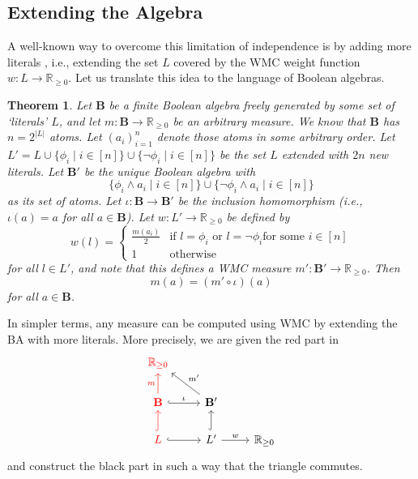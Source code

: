\documentclass{article}
\newtheorem{theorem}{Theorem}
\theoremstyle{definition}
\theoremstyle{remark}
\begin{document}
\subsection{Extending the Algebra}


A well-known way to overcome this limitation of independence is by adding more
literals \cite{DBLP:journals/ai/ChaviraD08}, i.e., extending the set $L$ covered
by the WMC weight function $w\colon L \to \mathbb{R}_{\ge 0}$. Let us translate this
idea to the language of Boolean algebras.

\begin{theorem} \label{thm:extension} %
  Let $\mathbf{B}$ be a finite Boolean algebra freely generated by some set of
  `literals' $L$, and let $m\colon \mathbf{B} \to \mathbb{R}_{\ge 0}$ be an
  arbitrary measure. We know that $\mathbf{B}$ has $n = 2^{|L|}$ atoms. Let
  $(a_i)_{i=1}^n$ denote those atoms in some arbitrary order. Let $L' = L \cup
  \{ \phi_i \mid i \in [n] \} \cup \{ \neg \phi_i \mid i \in [n] \}$ be the set
  $L$ extended with $2n$ new literals. Let $\mathbf{B'}$ be the unique Boolean
  algebra with
  \[
    \{ \phi_i \land a_i \mid i \in [n] \} \cup \{ \neg \phi_i \land a_i \mid i
    \in [n] \}
  \]
  as its set of atoms. Let $\iota\colon \mathbf{B} \to \mathbf{B'}$ be the inclusion
  homomorphism (i.e., $\iota(a) = a$ for all $a \in \mathbf{B}$). Let $w\colon L'
  \to \mathbb{R}_{\ge 0}$ be defined by
  \[
    w(l) = \begin{cases}
      \frac{m(a_i)}{2} & \text{if } l = \phi_i \text{ or } l = \neg\phi_i \text{
        for some } i \in [n] \\
      1 & \text{otherwise}
    \end{cases}
  \]
  for all $l \in L'$, and note that this defines a WMC measure $m'\colon \mathbf{B'}
  \to \mathbb{R}_{\ge 0}$. Then
  \[
    m(a) = (m' \circ \iota)(a)
  \]
  for all $a \in \mathbf{B}$.
\end{theorem}

In simpler terms, any measure can be computed using WMC by extending the BA with
more literals. More precisely, we are given the red part in
\[
  \begin{tikzcd}
    \textcolor{red}{\mathbb{R}_{\ge 0}} & & \\
    \textcolor{red}{\mathbf{B}} \arrow[red]{u}{m} \ar[r,hookrightarrow,"\iota"]
    & \mathbf{B'} \arrow{lu}[swap]{m'} & \\
    \textcolor{red}{L} \ar[u,red,hookrightarrow] \ar[r,hookrightarrow] & L'
    \ar[u,hookrightarrow] \arrow{r}{w} & \mathbb{R}_{\ge 0}
  \end{tikzcd}
\]
and construct the black part in such a way that the triangle commutes.
\end{document}
